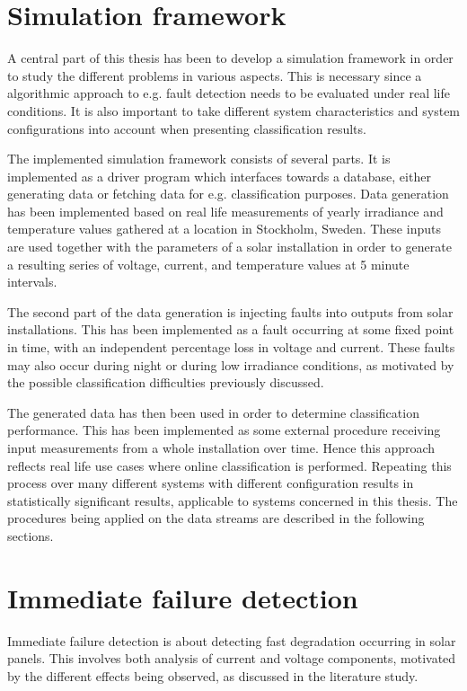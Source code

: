 \section{Simulation framework}
A central part of this thesis has been to develop a simulation framework in order to study the different problems in various aspects.
This is necessary since a algorithmic approach to e.g. fault detection needs to be evaluated under real life conditions.
It is also important to take different system characteristics and system configurations into account when presenting classification results.

The implemented simulation framework consists of several parts.
It is implemented as a driver program which interfaces towards a database, either generating data or fetching data for e.g. classification purposes.
Data generation has been implemented based on real life measurements of yearly irradiance and temperature values gathered at a location in Stockholm, Sweden.
These inputs are used together with the parameters of a solar installation in order to generate a resulting series of voltage, current, and temperature values at 5 minute intervals.

The second part of the data generation is injecting faults into outputs from solar installations.
This has been implemented as a fault occurring at some fixed point in time, with an independent percentage loss in voltage and current.
These faults may also occur during night or during low irradiance conditions, as motivated by the possible classification difficulties previously discussed.

The generated data has then been used in order to determine classification performance.
This has been implemented as some external procedure receiving input measurements from a whole installation over time.
Hence this approach reflects real life use cases where online classification is performed.
Repeating this process over many different systems with different configuration results in statistically significant results, applicable to systems concerned in this thesis.
The procedures being applied on the data streams are described in the following sections.

\section{Immediate failure detection}
Immediate failure detection is about detecting fast degradation occurring in solar panels.
This involves both analysis of current and voltage components, motivated by the different effects being observed, as discussed in the literature study.

